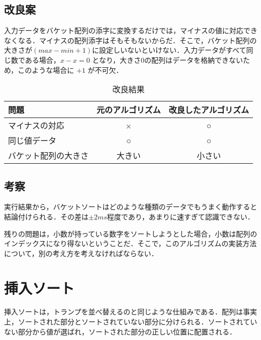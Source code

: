 \documentclass[a4j, titlepage]{jarticle}
\begin{document}
        \subsection{改良案}
            入力データをバケット配列の添字に変換するだけでは，マイナスの値に対応できなくなる．マイナスの配列添字はそもそもないからだ．そこで，バケット配列の大きさが$(max - min + 1)$に設定しいないといけない．入力データがすべて同じ数である場合，$ x - x = 0 $ となり，大きさ0の配列はデータを格納できないため，このような場合に $+ 1$ が不可欠．
            \begin{table}[tbh]
                \caption{改良結果}
                \label{tab:bucket_problem}
                \begin{center}
                    \begin{tabular}{|l|c|c|}
                        \hline
                        問題 & 元のアルゴリズム & 改良したアルゴリズム\\ \hline
                        マイナスの対応 & × & ○\\ \hline
                        同じ値データ & ○ & ○\\ \hline
                        バケット配列の大きさ & 大きい & 小さい\\ \hline
                    \end{tabular}
                \end{center}
            \end{table}

        \subsection{考察}
            実行結果から，バケットソートはどのような種類のデータでもうまく動作すると結論付けられる．その差は$\pm 2 ms$程度であり，あまりに速すぎて認識できない．

            残りの問題は，小数が持っている数字をソートしようとした場合，小数は配列のインデックスになり得ないということだ．そこで，このアルゴリズムの実装方法について，別の考え方を考えなければならない．


    \section{挿入ソート}
        挿入ソートは，トランプを並べ替えるのと同じような仕組みである．配列は事実上，ソートされた部分とソートされていない部分に分けられる．ソートされていない部分から値が選ばれ，ソートされた部分の正しい位置に配置される．
\end{document}

